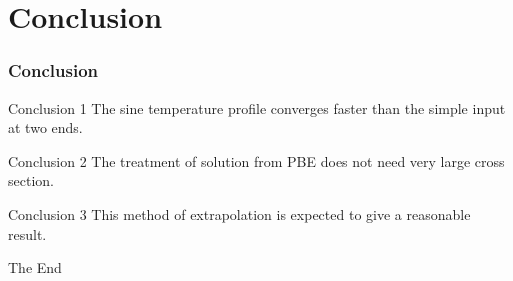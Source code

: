\documentclass{beamer}
\begin{document}
\section{Conclusion}
\begin{frame}
\frametitle{Conclusion}
\begin{block}{Conclusion 1}
The sine temperature profile converges faster than the simple input at two ends.
\end{block}

\begin{block}{Conclusion 2}
The treatment of solution from PBE does not need very large cross section.
\end{block}

\begin{block}{Conclusion 3}
This method of extrapolation is expected to give a reasonable result.
\end{block}
\end{frame}





%

\begin{frame}
\Huge{\centerline{The End}}
\end{frame}

\end{document}
